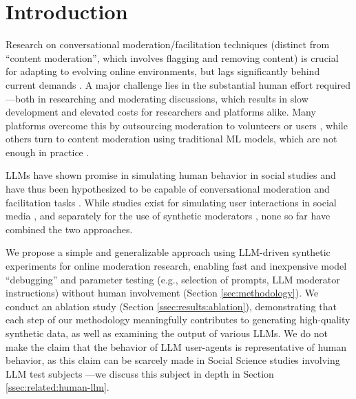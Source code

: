 %
\section{Introduction}
\label{sec:introduction}

Research on conversational moderation/facilitation techniques (distinct from “content moderation”, which involves flagging and removing content) is crucial for adapting to evolving online environments, but lags significantly behind current demands \cite{seering_self_moderation, make_reddit_great}. A major challenge lies in the substantial human effort required—both in researching and moderating discussions, which results in slow development and elevated costs for researchers and platforms alike. Many platforms overcome this by outsourcing moderation to volunteers or users \cite{Matias2019TheCL, schaffner_community_guidelines}, while others turn to content moderation using traditional \ac{ML} models, which are not enough in practice \cite{horta_automated_moderation, schaffner_community_guidelines}. 

\acfp{LLM} have shown promise in simulating human behavior in social studies \cite{park2024generativeagentsimulations1000, hewitt2024predicting, Park2023GenerativeAI} and have thus been hypothesized to be capable of conversational moderation and facilitation tasks \cite{small-polis-llm, korre2025evaluation}. While studies exist for simulating user interactions in social media \cite{park_simulacra, mou_2024, tornberg_2023, y_social, balog_2024}, and separately for the use of synthetic moderators \cite{kim_et_al_chatbot, cho-etal-2024-language}, none so far have combined the two approaches. 

We propose a simple and generalizable approach using \ac{LLM}-driven synthetic experiments for online moderation research, enabling fast and inexpensive model “debugging” and parameter testing (e.g., selection of prompts, \ac{LLM} moderator instructions) without human involvement (Section \ref{sec:methodology}). We conduct an ablation study (Section \ref{ssec:results:ablation}), demonstrating that each step of our methodology meaningfully contributes to generating high-quality synthetic data, as well as examining the output of various \acp{LLM}. We do not make the claim that the behavior of \ac{LLM} user-agents is representative of human behavior, as this claim can be scarcely made in Social Science studies involving \ac{LLM} test subjects \cite{rossi_2024}—we discuss this subject in depth in Section \ref{ssec:related:human-llm}.

